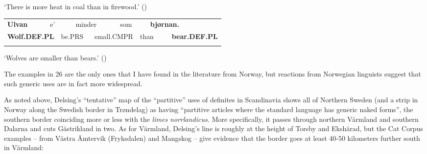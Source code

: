 \begin{styleTranslation}
‘There is more heat in coal than in firewood.’ (\citet[19]{Iversen1918})

\end{styleTranslation}

\begin{tabular}{llllllllll}
\lsptoprule
{\bfseries Ulvan} & \multicolumn{2}{l}{e’

} & \multicolumn{2}{l}{minder

} & \multicolumn{2}{l}{som

} & \multicolumn{2}{l}{{\bfseries bjørnan.}

} & \\
\multicolumn{2}{l}{{\bfseries Wolf.DEF.PL}

} & \multicolumn{2}{l}{be.PRS

} & \multicolumn{2}{l}{small.CMPR

} & \multicolumn{2}{l}{than

} & \multicolumn{2}{l}{{\bfseries bear.DEF.PL}

}\\
\lspbottomrule
\end{tabular}

\begin{styleTranslation}
‘Wolves are smaller than bears.’ (\citet[18]{Iversen1918})

\end{styleTranslation}

\begin{styleBodyTextFirst}
The examples in 26 are the only ones that I have found in the literature from Norway, but reactions from Norwegian linguists suggest that such generic uses are in fact more widespread. 

\end{styleBodyTextFirst}

\begin{styleBodytextC}
As noted above, Delsing’s “tentative” map of the “partitive” uses of definites in Scandinavia shows all of Northern Sweden (and a strip in Norway along the Swedish border in Trøndelag) as having “partitive articles where the standard language has generic naked forms”, the southern border coinciding more or less with the \textit{limes norrlandicus.} More specifically, it passes through northern Värmland and southern Dalarna and cuts Gästrikland in two. As for Värmland, Delsing’s line is roughly at the height of Torsby and Ekshärad, but the Cat Corpus examples – from Västra Ämtervik (Fryksdalen) and Mangskog – give evidence that the border goes at least 40-50 kilometers further south in Värmland: 

\end{styleBodytextC}

